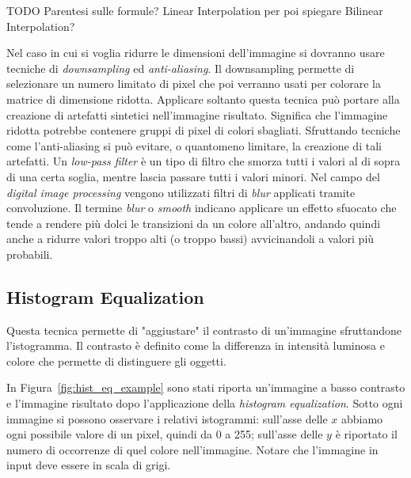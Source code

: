 TODO
Parentesi sulle formule?
Linear Interpolation
per poi spiegare Bilinear Interpolation?


Nel caso in cui si voglia ridurre le dimensioni dell'immagine si dovranno usare tecniche di \textit{downsampling} ed \textit{anti-aliasing}.
Il downsampling permette di selezionare un numero limitato di pixel che poi verranno usati per colorare la matrice di dimensione ridotta.
Applicare soltanto questa tecnica può portare alla creazione di artefatti sintetici nell'immagine risultato.
Significa che l'immagine ridotta potrebbe contenere gruppi di pixel di colori sbagliati.
Sfruttando tecniche come l'anti-aliasing si può evitare, o quantomeno limitare, la creazione di tali artefatti.
Un \textit{low-pass filter} è un tipo di filtro che smorza tutti i valori al di sopra di una certa soglia, mentre lascia passare tutti i valori minori.
Nel campo del \textit{digital image processing} vengono utilizzati filtri di \textit{blur} applicati tramite convoluzione.
Il termine \textit{blur} o \textit{smooth} indicano applicare un effetto sfuocato che tende a rendere più dolci le transizioni da un colore all'altro, andando quindi anche a ridurre valori troppo alti (o troppo bassi) avvicinandoli a valori più probabili.


\clearpage
\subsection {Histogram Equalization}
Questa tecnica permette di "aggiustare" il contrasto di un'immagine sfruttandone l'istogramma.
Il contrasto è definito come la differenza in intensità luminosa e colore che permette di distinguere gli oggetti.

In Figura~\ref{fig:hist_eq_example} sono stati riporta un'immagine a basso contrasto e l'immagine risultato dopo l'applicazione della \textit{histogram equalization}.
Sotto ogni immagine si possono osservare i relativi istogrammi: sull'asse delle $x$ abbiamo ogni possibile valore di un pixel, quindi da 0 a 255; sull'asse delle $y$ è riportato il numero di occorrenze di quel colore nell'immagine.
Notare che l'immagine in input deve essere in scala di grigi.

